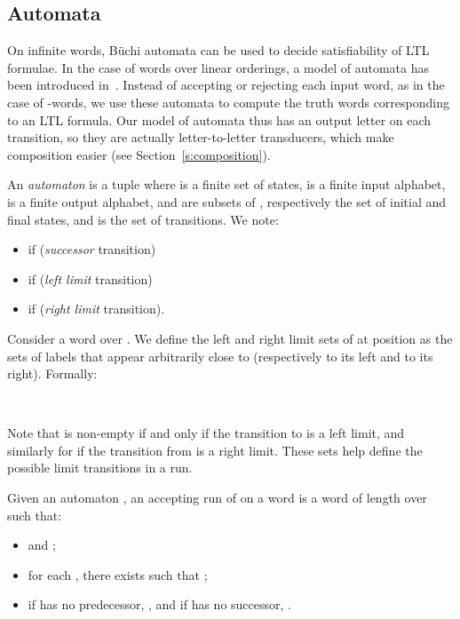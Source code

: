 \documentclass[envcountsame]{fsttcs-ps}
\begin{document}
\subsection{Automata}

On infinite words, Büchi automata can be used to decide satisfiability of LTL
formulae.  In the case of words over linear orderings, a model of automata has
been introduced in~\cite{DBLP:conf/mfcs/BruyereC01}.  Instead of accepting or
rejecting each input word, as in the case of -words, we use these
automata to compute the truth words corresponding to an LTL formula.  Our
model of automata thus has an output letter on each transition, so they are
actually letter-to-letter transducers, which make composition easier
(see Section~\ref{s:composition}).

An \emph{automaton} is a tuple  where
 is a finite set of states,
 is a finite input alphabet,
 is a finite output alphabet,
 and  are subsets of , respectively the set of initial and
final states,
and  is the set of transitions.  We note:
\begin{itemize}
\item  if  (\emph{successor}
transition)
\item  if  (\emph{left limit} transition)
\item  if  (\emph{right limit} transition).
\end{itemize}


Consider a word  over .
We define the left and right limit sets of  at position  as the
sets of labels that appear arbitrarily close to  (respectively to its left
and to its right).  Formally:
\begin{center}
\\

\end{center}
Note that  is non-empty if and only if the transition to  is a
left limit, and similarly for  if the transition from  is a
right limit.  These sets help define the possible limit transitions in a run.

Given an automaton , an accepting run of  on a word  is a word  of length  over  such that:
\begin{itemize}
\item  and ;
\item for each , there exists  such that
;
\item if  has no predecessor,
, and if  has no successor, .
\end{itemize}
\end{document}
